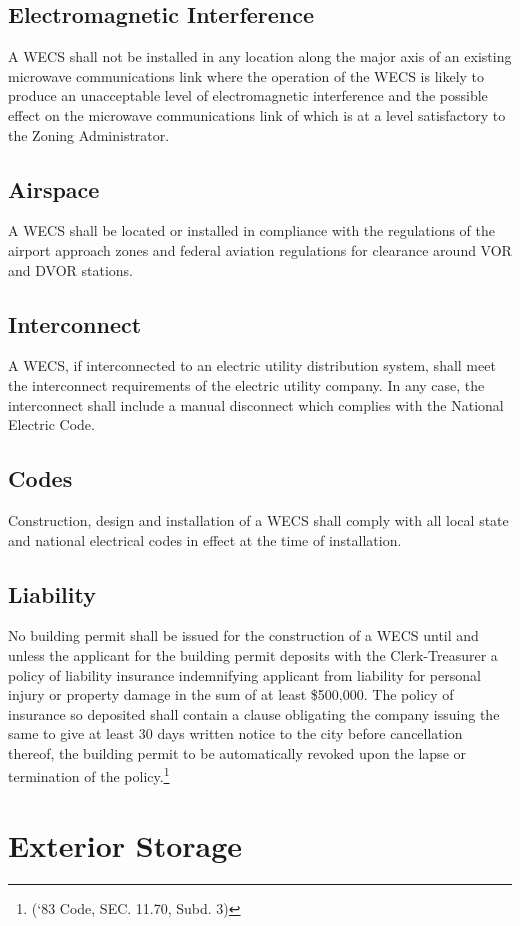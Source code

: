\subsection{Electromagnetic Interference}
A WECS shall not be installed in any location along the major axis of an existing microwave communications link where the operation of the WECS is likely to produce an unacceptable level of electromagnetic interference and the possible effect on the microwave communications link of which is at a level satisfactory to the Zoning Administrator.
\subsection{Airspace}
A WECS shall be located or installed in compliance with the regulations of the airport approach zones and federal aviation regulations for clearance around VOR and DVOR stations.
\subsection{Interconnect}
A WECS, if interconnected to an electric utility distribution system, shall meet the interconnect requirements of the electric utility company. In any case, the interconnect shall include a manual disconnect which complies with the National Electric Code.
\subsection{Codes}
Construction, design and installation of a WECS shall comply with all local state and national electrical codes in effect at the time of installation.
\subsection{Liability}
No building permit shall be issued for the construction of a WECS until and unless the applicant for the building permit deposits with the Clerk-Treasurer a policy of liability insurance indemnifying applicant from liability for personal injury or property damage in the sum of at least \$500,000. The policy of insurance so deposited shall contain a clause obligating the company issuing the same to give at least 30 days written notice to the city before cancellation thereof, the building permit to be automatically revoked upon the lapse or termination of the policy.\footnote{(‘83 Code, SEC. 11.70, Subd. 3)}

\section{Exterior Storage}
